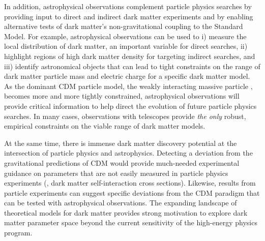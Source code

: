 In addition, astrophysical observations complement particle physics searches by providing input to direct and indirect dark matter experiments and by enabling alternative tests of dark matter's non-gravitational coupling to the Standard Model.  
For example, astrophysical observations can be used to i) measure the local distribution of dark matter, an important variable for direct searches, ii) highlight regions of high dark matter density for targeting indirect searches, and iii) identify astronomical objects that can lead to tight constraints on the range of dark matter particle mass and electric charge for a specific dark matter model.  
As the dominant CDM particle model, the weakly interacting massive particle \citep[WIMP;][]{steigman1985}, becomes more and more tightly constrained, astrophysical observations will provide critical information to help direct the evolution of future particle physics searches.  
In many cases, observations with telescopes provide \emph{the only} robust, empirical constraints on the viable range of dark matter models.

At the same time, there is immense dark matter discovery potential at the intersection of particle physics and astrophysics.
Detecting a deviation from the gravitational predictions of CDM would provide much-needed experimental guidance on parameters that are not easily measured in particle physics experiments (\eg, dark matter self-interaction cross sections). 
Likewise, results from particle experiments can suggest specific deviations from the CDM paradigm that can be tested with astrophysical observations.
The expanding landscape of theoretical models for dark matter provides strong motivation to explore dark matter parameter space beyond the current sensitivity of the high-energy physics program.

